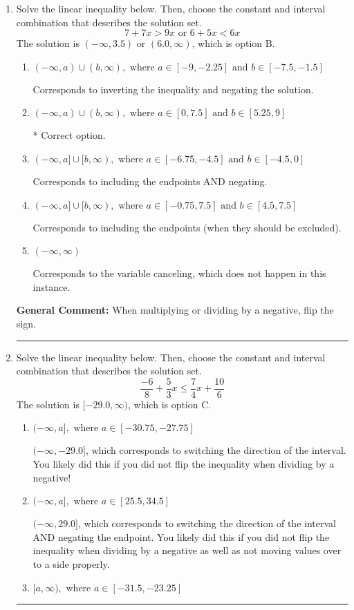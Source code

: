 \documentclass{extbook}[14pt]
\newcommand{\litem}[1]{\item #1

\rule{\textwidth}{0.4pt}}
\begin{document}
\begin{enumerate}\litem{
Solve the linear inequality below. Then, choose the constant and interval combination that describes the solution set.
\[ 7 + 7 x > 9 x \text{ or } 6 + 5 x < 6 x \]The solution is \( (-\infty, 3.5) \text{ or } (6.0, \infty) \), which is option B.\begin{enumerate}[label=\Alph*.]
\item \( (-\infty, a) \cup (b, \infty), \text{ where } a \in [-9, -2.25] \text{ and } b \in [-7.5, -1.5] \)

Corresponds to inverting the inequality and negating the solution.
\item \( (-\infty, a) \cup (b, \infty), \text{ where } a \in [0, 7.5] \text{ and } b \in [5.25, 9] \)

 * Correct option.
\item \( (-\infty, a] \cup [b, \infty), \text{ where } a \in [-6.75, -4.5] \text{ and } b \in [-4.5, 0] \)

Corresponds to including the endpoints AND negating.
\item \( (-\infty, a] \cup [b, \infty), \text{ where } a \in [-0.75, 7.5] \text{ and } b \in [4.5, 7.5] \)

Corresponds to including the endpoints (when they should be excluded).
\item \( (-\infty, \infty) \)

Corresponds to the variable canceling, which does not happen in this instance.
\end{enumerate}

\textbf{General Comment:} When multiplying or dividing by a negative, flip the sign.
}
\litem{
Solve the linear inequality below. Then, choose the constant and interval combination that describes the solution set.
\[ \frac{-6}{8} + \frac{5}{3} x \leq \frac{7}{4} x + \frac{10}{6} \]The solution is \( [-29.0, \infty) \), which is option C.\begin{enumerate}[label=\Alph*.]
\item \( (-\infty, a], \text{ where } a \in [-30.75, -27.75] \)

 $(-\infty, -29.0]$, which corresponds to switching the direction of the interval. You likely did this if you did not flip the inequality when dividing by a negative!
\item \( (-\infty, a], \text{ where } a \in [25.5, 34.5] \)

 $(-\infty, 29.0]$, which corresponds to switching the direction of the interval AND negating the endpoint. You likely did this if you did not flip the inequality when dividing by a negative as well as not moving values over to a side properly.
\item \( [a, \infty), \text{ where } a \in [-31.5, -23.25] \)


\end{enumerate}}
\end{enumerate}
\end{document}
